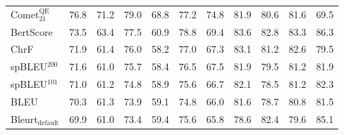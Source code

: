 \begin{tabular}{lcccc}
Comet$_\textrm{21}^\textrm{QE}$         &         76.8 &      71.2 &      79.0 &          68.8 &         77.2 &         74.8 &        81.9 &        80.6 &            81.6 &      69.5 \\
BertScore                               &         73.5 &      63.4 &      77.5 &          60.9 &         78.8 &         69.4 &        83.6 &        82.8 &            83.3 &      86.3 \\
ChrF                                    &         71.9 &      61.4 &      76.0 &          58.2 &         77.0 &         67.3 &        83.1 &        81.2 &            82.6 &      79.5 \\
spBLEU$^\textrm{200}$                   &         71.6 &      61.0 &      75.7 &          58.4 &         76.5 &         67.5 &        81.9 &        79.5 &            81.2 &      81.9 \\
spBLEU$^\textrm{101}$                   &         71.0 &      61.2 &      74.8 &          58.9 &         75.6 &         66.7 &        82.1 &        78.5 &            81.2 &      82.3 \\
BLEU                                    &         70.3 &      61.3 &      73.9 &          59.1 &         74.8 &         66.0 &        81.6 &        78.7 &            80.8 &      81.5 \\
Bleurt$_\textrm{default}$               &         69.9 &      61.0 &      73.4 &          59.4 &         75.6 &         65.8 &        78.6 &        82.4 &            79.6 &      85.1 \\
\bottomrule
\end{tabular}
